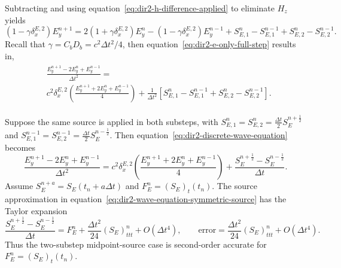 \documentclass{article}
\numberwithin{figure}{section}
\begin{document}
Subtracting and using equation~\eqref{eq:dir2-h-difference-applied} to eliminate $H_z$ yields
\begin{equation}
    \left(1-\gamma\delta_x^{E,2}\right)E_y^{n+1} = 2\left(1+\gamma\delta_x^{E,2}\right)E_y^n-\left(1-\gamma\delta_x^{E,2}\right)E_y^{n-1}+S_{E,1}^n-S_{E,1}^{n-1}+S_{E,2}^n-S_{E,2}^{n-1}. \label{eq:dir2-e-only-full-step}
\end{equation}
Recall that $\gamma=C_bD_b=c^2\Delta t^2/4$, then equation~\eqref{eq:dir2-e-only-full-step} results in,
\begin{align}
    \begin{split}
         & \frac{E_y^{n+1}-2E_y^n+E_y^{n-1}}{\Delta t^2}=                                                                                                           \\
         & c^2\delta_x^{E,2}\left(\frac{E_y^{n+1}+2E_y^n+E_y^{n-1}}{4}\right)+\frac{1}{\Delta t^2}\left[S_{E,1}^n-S_{E,1}^{n-1}+S_{E,2}^n-S_{E,2}^{n-1}\right]. \label{eq:dir2-discrete-wave-equation}
    \end{split}
\end{align}

Suppose the same source is applied in both substeps, with $S_{E,1}^n=S_{E,2}^n=\frac{\Delta t}{2}S_E^{n+\frac{1}{2}}$ and $S_{E,1}^{n-1}=S_{E,2}^{n-1}=\frac{\Delta t}{2}S_E^{n-\frac{1}{2}}$. Then equation~\eqref{eq:dir2-discrete-wave-equation} becomes
\begin{equation}
    \frac{E_y^{n+1}-2E_y^n+E_y^{n-1}}{\Delta t^2}=c^2\delta_x^{E,2}\left(\frac{E_y^{n+1}+2E_y^n+E_y^{n-1}}{4}\right)+\frac{S_E^{n+\frac{1}{2}}-S_E^{n-\frac{1}{2}}}{\Delta t}. \label{eq:dir2-wave-equation-symmetric-source}
\end{equation}
Assume $S_E^{n+a}=S_E(t_n+a\Delta t)$ and $F_E^n=(S_E)_t(t_n)$. The source approximation in equation~\eqref{eq:dir2-wave-equation-symmetric-source} has the Taylor expansion
\begin{equation}
    \frac{S_E^{n+\frac{1}{2}}-S_E^{n-\frac{1}{2}}}{\Delta t}=F_E^n+\frac{\Delta t^2}{24}(S_E)_{ttt}^n+O(\Delta t^4), \qquad \mathrm{error}=\frac{\Delta t^2}{24}(S_E)_{ttt}^n+O(\Delta t^4). \label{eq:dir2-symmetric-source-error}
\end{equation}
Thus the two-substep midpoint-source case is second-order accurate for $F_E^n=(S_E)_t(t_n)$.
\end{document}
